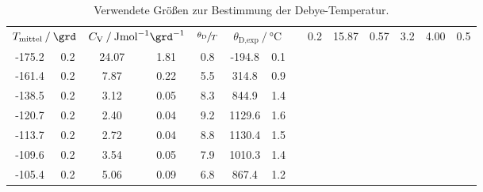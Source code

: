 \begin{table}
    \centering
    \caption{Verwendete Größen zur Bestimmung der Debye-Temperatur.}
    \label{tab:theta}
    \begin{tabular}{S[table-format=3.2] @{${}\pm{}$} S
                    S[table-format=2.2] @{${}\pm{}$} S[table-format=1.2]
                    S
                    S[table-format=4.1] @{${}\pm{}$} S}
    \toprule
         &
         &
        {$\sfrac{\theta_\text{D}}{T}$} &
         &
     & 0.2 & 15.87 & 0.57 & 3.2 & 4.00 & 0.5 \\
    -175.2 & 0.2 & 24.07 & 1.81 & 0.8 & -194.8 & 0.1 \\
    -161.4 & 0.2 & 7.87 & 0.22 & 5.5 & 314.8 & 0.9 \\
    -138.5 & 0.2 & 3.12 & 0.05 & 8.3 & 844.9 & 1.4 \\
    -120.7 & 0.2 & 2.40 & 0.04 & 9.2 & 1129.6 & 1.6 \\
    -113.7 & 0.2 & 2.72 & 0.04 & 8.8 & 1130.4 & 1.5 \\
    -109.6 & 0.2 & 3.54 & 0.05 & 7.9 & 1010.3 & 1.4 \\
    -105.4 & 0.2 & 5.06 & 0.09 & 6.8 & 867.4 & 1.2 \\
    \end{tabular}
\end{table}
